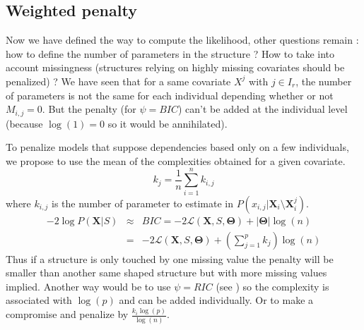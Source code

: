 \documentclass[12pt,a4paper]{report}
\begin{document}
%
%
	\subsection{Weighted penalty}
			Now we have defined the way to compute the likelihood, other questions remain : how to define the number of parameters in the structure ?		How to take into account missingness (structures relying on highly missing covariates should be penalized) ?
			We have seen that for a same covariate $X^j$ with $ j \in I_r$, the number of parameters is not the same for each individual depending whether or not $M_{i,j}=0$. But the penalty (for $\psi=BIC$) can't be added at the individual level (because $\log(1)=0$ so it would be annihilated). 
			
			To penalize models that suppose dependencies based only on a few individuals, we propose to use the mean of the complexities obtained for a given covariate.
			\begin{equation}
			k_j=\frac{1}{n}\sum_{i=1}^nk_{i,j}
\end{equation}						where $k_{i,j}$ is the number of parameter to estimate in $P(x_{i,j}|\boldsymbol{X}_i\setminus \boldsymbol{X}_i^j)$.
			\begin{eqnarray}
		-2\log P(\boldsymbol{X}|S)&\approx & BIC=-2\mathcal{L}(\boldsymbol{X},S,\boldsymbol{\Theta})+|\boldsymbol{\Theta}|\log(n) \\
		&=& -2\mathcal{L}(\boldsymbol{X},S,\boldsymbol{\Theta})+(\sum_{j=1}^pk_j)\log(n)
	\end{eqnarray}
			 Thus if a structure is only touched by one missing value the penalty will be smaller than another same shaped structure but with more missing values implied.
			Another way would be to use $\psi=RIC$ (see \cite{foster1994risk}) so the complexity is associated with $\log(p)$ and can be added individually. Or to make a compromise and penalize by $\frac{k_i\log(p)}{\log(n)}$.
		
\end{document}
